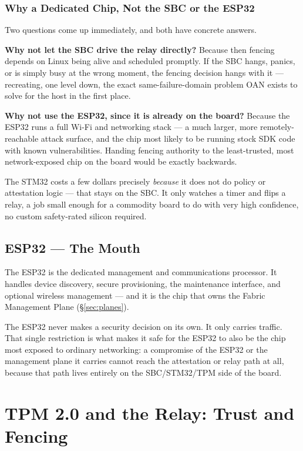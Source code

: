 \documentclass[11pt,a4paper]{article}
\begin{document}
\subsubsection{Why a Dedicated Chip, Not the SBC or the ESP32}

Two questions come up immediately, and both have concrete answers.

\textbf{Why not let the SBC drive the relay directly?} Because then
fencing depends on Linux being alive and scheduled promptly. If the SBC
hangs, panics, or is simply busy at the wrong moment, the fencing
decision hangs with it --- recreating, one level down, the exact
same-failure-domain problem OAN exists to solve for the host in the
first place.

\textbf{Why not use the ESP32, since it is already on the board?}
Because the ESP32 runs a full Wi-Fi and networking stack --- a much
larger, more remotely-reachable attack surface, and the chip most
likely to be running stock SDK code with known vulnerabilities. Handing
fencing authority to the least-trusted, most network-exposed chip on
the board would be exactly backwards.

The STM32 costs a few dollars precisely \emph{because} it does not do
policy or attestation logic --- that stays on the SBC. It only watches
a timer and flips a relay, a job small enough for a commodity board to
do with very high confidence, no custom safety-rated silicon required.

\subsection{ESP32 --- The Mouth}

The ESP32 is the dedicated management and communications processor. It
handles device discovery, secure provisioning, the maintenance
interface, and optional wireless management --- and it is the chip that
owns the Fabric Management Plane (\S\ref{sec:planes}).

The ESP32 never makes a security decision on its own. It only carries
traffic. That single restriction is what makes it safe for the ESP32 to
also be the chip most exposed to ordinary networking: a compromise of
the ESP32 or the management plane it carries cannot reach the
attestation or relay path at all, because that path lives entirely on
the SBC/STM32/TPM side of the board.

\section{TPM 2.0 and the Relay: Trust and Fencing}
\label{sec:tpm-relay}
\end{document}
